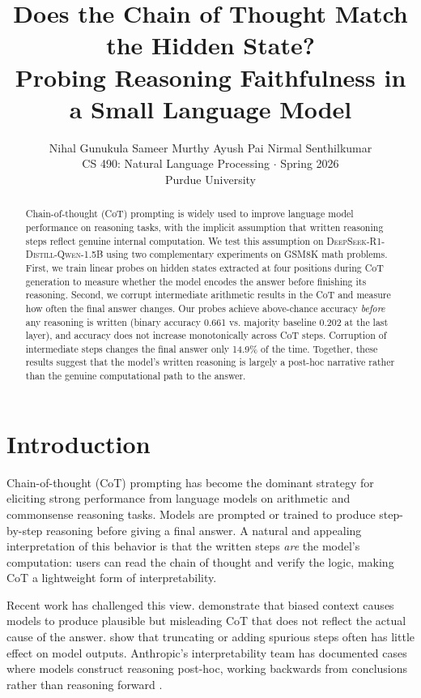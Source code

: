 \documentclass[11pt]{article}
\title{Does the Chain of Thought Match the Hidden State?\\
Probing Reasoning Faithfulness in a Small Language Model}
\author{
  Nihal Gunukula \quad Sameer Murthy \quad Ayush Pai \quad Nirmal Senthilkumar \\
  CS 490: Natural Language Processing $\cdot$ Spring 2026 \\
  Purdue University
}
\begin{document}
\maketitle

\begin{abstract}
Chain-of-thought (CoT) prompting is widely used to improve language model performance on reasoning tasks, with the implicit assumption that written reasoning steps reflect genuine internal computation. We test this assumption on \textsc{DeepSeek-R1-Distill-Qwen-1.5B} using two complementary experiments on GSM8K math problems. First, we train linear probes on hidden states extracted at four positions during CoT generation to measure whether the model encodes the answer before finishing its reasoning. Second, we corrupt intermediate arithmetic results in the CoT and measure how often the final answer changes. Our probes achieve above-chance accuracy \textit{before} any reasoning is written (binary accuracy 0.661 vs. majority baseline 0.202 at the last layer), and accuracy does not increase monotonically across CoT steps. Corruption of intermediate steps changes the final answer only 14.9\% of the time. Together, these results suggest that the model's written reasoning is largely a post-hoc narrative rather than the genuine computational path to the answer.
\end{abstract}

\section{Introduction}

Chain-of-thought (CoT) prompting \cite{wei2022chain} has become the dominant strategy for eliciting strong performance from language models on arithmetic and commonsense reasoning tasks. Models are prompted or trained to produce step-by-step reasoning before giving a final answer. A natural and appealing interpretation of this behavior is that the written steps \textit{are} the model's computation: users can read the chain of thought and verify the logic, making CoT a lightweight form of interpretability.

Recent work has challenged this view. \citet{turpin2024language} demonstrate that biased context causes models to produce plausible but misleading CoT that does not reflect the actual cause of the answer. \citet{lanham2023measuring} show that truncating or adding spurious steps often has little effect on model outputs. Anthropic's interpretability team has documented cases where models construct reasoning post-hoc, working backwards from conclusions rather than reasoning forward \cite{anthropic2025biology}.
\end{document}
